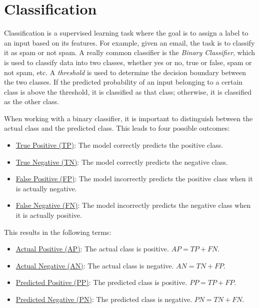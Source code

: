 \section{Classification}\label{sec:classification}

Classification is a supervised learning task where the goal is to assign a label to an input based on its features. For example, given an email, the task is to classify it as spam or not spam. A really common classifier is the \emph{Binary Classifier}, which is used to classify data into two classes, whether yes or no, true or false, spam or not spam, etc. A \emph{threshold} is used to determine the decision boundary between the two classes. If the predicted probability of an input belonging to a certain class is above the threshold, it is classified as that class; otherwise, it is classified as the other class.

When working with a binary classifier, it is important to distinguish between the actual class and the predicted class. This leads to four possible outcomes:
\begin{itemize}
    \item \ul{True Positive (TP)}: The model correctly predicts the positive class.
    \item \ul{True Negative (TN)}: The model correctly predicts the negative class.
    \item \ul{False Positive (FP)}: The model incorrectly predicts the positive class when it is actually negative.
    \item \ul{False Negative (FN)}: The model incorrectly predicts the negative class when it is actually positive.
\end{itemize}

This results in the following terms:
\begin{itemize}
    \item \ul{Actual Positive (AP)}: The actual class is positive. $AP = TP + FN$.
    \item \ul{Actual Negative (AN)}: The actual class is negative. $AN = TN + FP$.
    \item \ul{Predicted Positive (PP)}: The predicted class is positive. $PP = TP + FP$.
    \item \ul{Predicted Negative (PN)}: The predicted class is negative. $PN = TN + FN$.
\end{itemize}

